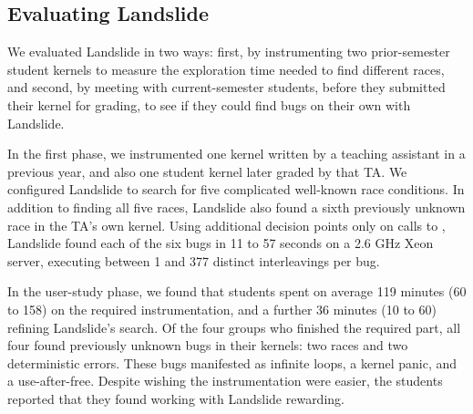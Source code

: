 %

\subsection{Evaluating Landslide}

We evaluated Landslide in two ways: first, by instrumenting two prior-semester student kernels to measure the exploration time needed to find different races, and second, by meeting with current-semester students, before they submitted their kernel for grading, to see if they could find bugs on their own with Landslide.

In the first phase, we instrumented one kernel written by a teaching assistant in a previous year, and also one student kernel later graded by that TA.
We configured Landslide to search for five complicated well-known race conditions.
In addition to finding all five races, Landslide also found a sixth previously unknown race in the TA's own kernel.
Using additional decision points only on calls to , Landslide found each of the six bugs in 11 to 57 seconds on a 2.6 GHz Xeon server, executing between 1 and 377 distinct interleavings per bug.

In the user-study phase, we found that students spent on average 119 minutes (60 to 158) on the required instrumentation, and a further 36 minutes (10 to 60) refining Landslide's search.
Of the four groups who finished the required part, all four found previously unknown bugs in their kernels: two races and two deterministic errors.
These bugs manifested as infinite loops, a kernel panic, and a use-after-free.
Despite wishing the instrumentation were easier, the students reported that they found working with Landslide rewarding.
